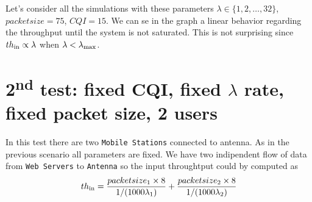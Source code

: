 Let's consider all the simulations with these parameters \(\lambda \in \{1,2,\ldots,32\}\), \(packetsize=75\), \(CQI=15\). We can se in the graph a linear behavior regarding the throughput until the system is not saturated. This is not surprising since \(th\textsubscript{in} \propto \lambda\) when \(\lambda < \lambda\textsubscript{max}\).

\section{2\textsuperscript{nd} test: fixed CQI, fixed \(\lambda\) rate, fixed packet size, 2 users}
In this test there are two \texttt{Mobile Stations} connected to antenna. As in the previous scenario all parameters are fixed. We have two indipendent flow of data from \texttt{Web Servers} to \texttt{Antenna} so the input throughtput could by computed as
\[ th\textsubscript{in} = \frac{packetsize\textsubscript{1} \times 8}{1/(1000\lambda\textsubscript{1})} + \frac{packetsize\textsubscript{2} \times 8}{1/(1000\lambda\textsubscript{2})}\]
